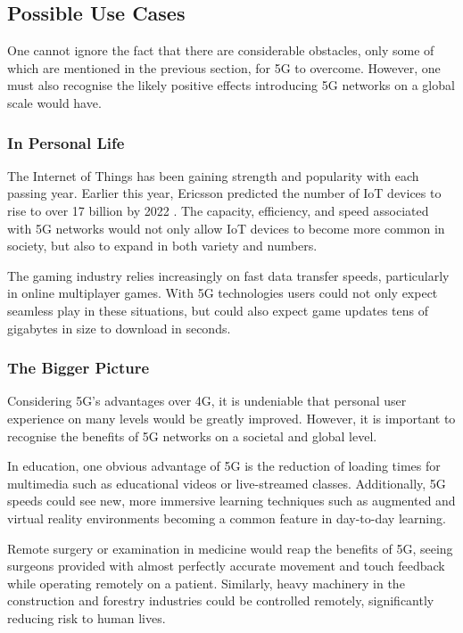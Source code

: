\documentclass[journal]{IEEEtran}
\begin{document}
\subsection{Possible Use Cases}
One cannot ignore the fact that there are considerable obstacles, only some of which are mentioned in the previous section, for 5G to overcome. However, one must also recognise the likely positive effects introducing 5G networks on a global scale would have.

\subsubsection{In Personal Life}
The Internet of Things has been gaining strength and popularity with each passing year. Earlier this year, Ericsson predicted the number of IoT devices to rise to over 17 billion by 2022 \cite{ericssondev}. The capacity, efficiency, and speed associated with 5G networks would not only allow IoT devices to become more common in society, but also to expand in both variety and numbers.

The gaming industry relies increasingly on fast data transfer speeds, particularly in online multiplayer games. With 5G technologies users could not only expect seamless play in these situations, but could also expect game updates tens of gigabytes in size to download in seconds.

\subsubsection{The Bigger Picture}
Considering 5G's advantages over 4G, it is undeniable that personal user experience on many levels would be greatly improved. However, it is important to recognise the benefits of 5G networks on a societal and global level.

In education, one obvious advantage of 5G is the reduction of loading times for multimedia such as educational videos or live-streamed classes. Additionally, 5G speeds could see new, more immersive learning techniques such as augmented and virtual reality environments becoming a common feature in day-to-day learning.

Remote surgery or examination in medicine would reap the benefits of 5G, seeing surgeons provided with almost perfectly accurate movement and touch feedback while operating remotely on a patient. \cite{wp5g} Similarly, heavy machinery in the construction and forestry industries could be controlled remotely, significantly reducing risk to human lives.
\end{document}
